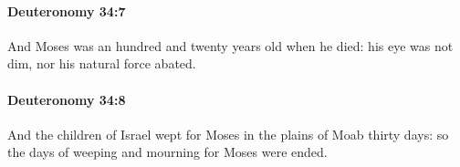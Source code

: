 		\paragraph{Deuteronomy 34:7} %
			\label{DEUTERONOMY-34-7}

			And Moses was an hundred and twenty years old when he died: his eye was not dim, nor his natural force abated.


		\paragraph{Deuteronomy 34:8} %
			\label{DEUTERONOMY-34-8}

			And the children of Israel wept for Moses in the plains of Moab thirty days: so the days of weeping and mourning for Moses were ended.


